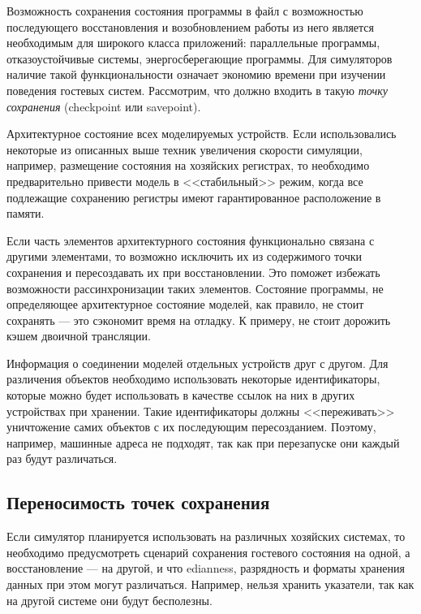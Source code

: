 Возможность сохранения состояния программы в файл с возможностью последующего восстановления и возобновлением работы из него является необходимым для широкого класса приложений: параллельные программы, отказоустойчивые системы, энергосберегающие программы. Для симуляторов наличие такой функциональности означает экономию времени при изучении поведения гостевых систем. Рассмотрим, что должно входить в такую \textit{точку сохранения} (\abbr checkpoint или savepoint).

\begin{itemize*}
    \item Архитектурное состояние всех моделируемых устройств. Если использовались некоторые из описанных выше техник увеличения скорости симуляции, например, размещение состояния на хозяйских регистрах, то необходимо предварительно привести модель в <<стабильный>> режим, когда все подлежащие сохранению регистры имеют гарантированное расположение в памяти.
    
\item    Если часть элементов архитектурного состояния функционально связана с другими элементами, то возможно исключить их из содержимого точки сохранения и пересоздавать их при восстановлении. Это поможет избежать возможности рассинхронизации таких элементов. Состояние программы, не определяющее архитектурное состояние моделей, как правило, не стоит сохранять — это сэкономит время на отладку. К примеру, не стоит дорожить кэшем двоичной трансляции.
    
    \item Информация о соединении моделей отдельных устройств друг с другом. Для различения объектов необходимо использовать некоторые идентификаторы, которые можно будет использовать в качестве ссылок на них в других устройствах при хранении. Такие идентификаторы должны <<переживать>> уничтожение самих объектов с их последующим пересозданием. Поэтому, например, машинные адреса не подходят, так как при перезапуске они каждый раз будут различаться.
\end{itemize*}

\subsection{Переносимость точек сохранения}

Если симулятор планируется использовать на различных хозяйских системах, то необходимо предусмотреть сценарий сохранения гостевого состояния на одной, а восстановление — на другой, и что edianness, разрядность и форматы хранения данных при этом могут различаться. Например, нельзя хранить указатели, так как на другой системе они будут бесполезны.

